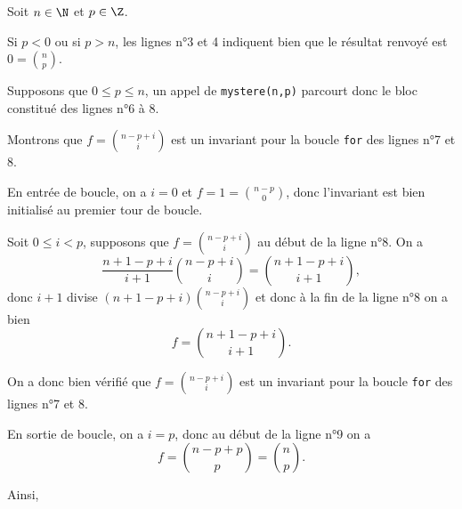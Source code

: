 Soit $n\in\N$ et $p\in\Z$.

Si $p < 0$ ou si $p > n$, les lignes n°3 et 4 indiquent bien que le résultat renvoyé est $\displaystyle 0 = \binom{n}{p}$.

Supposons que $0 \leq p \leq n$, un appel de \texttt{mystere(n,p)} parcourt donc le bloc constitué des lignes n°6 à 8.

Montrons que \og $\displaystyle f = \binom{n-p+i}{i}$ \fg{} est un invariant pour la boucle \texttt{for} des lignes n°7 et 8. 

En entrée de boucle, on a $i = 0$ et $\displaystyle f = 1 = \binom{n-p}{0}$, donc l'invariant est bien initialisé au premier tour de boucle. 

Soit $0 \leq i < p$, supposons que $\displaystyle f = \binom{n-p+i}{i}$ au début de la ligne n°8. On a 
\begin{equation*}
  \dfrac{n+1-p+i}{i+1}\binom{n-p+i}{i} = \binom{n+1-p+i}{i+1},
\end{equation*}
donc $i+1$ divise $\displaystyle (n+1-p+i) \binom{n-p+i}{i}$ et donc à la fin de la ligne n°8 on a bien 
\begin{equation*}
  f = \binom{n+1-p+i}{i+1}.
\end{equation*}

On a donc bien vérifié que \og $\displaystyle f = \binom{n-p+i}{i}$ \fg{} est un invariant pour la boucle \texttt{for} des lignes n°7 et 8. 

En sortie de boucle, on a $i = p$, donc au début de la ligne n°9 on a 
\begin{equation*}
  f = \binom{n-p + p}{p} = \binom{n}{p}.
\end{equation*}

Ainsi, 
\begin{center}
\end{center}

